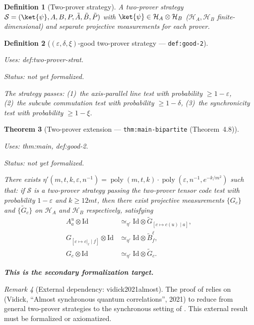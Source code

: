 \documentclass{article}
\providecommand{\uses}[1]{\par\smallskip\noindent\emph{Uses:} #1.\par\smallskip}
\providecommand{\notready}{\par\smallskip\noindent\emph{Status: not yet formalized.}\par\smallskip}
\newtheorem{definition}{Definition}[section]
\newtheorem{theorem}[definition]{Theorem}
\theoremstyle{remark}
\newtheorem{remark}[definition]{Remark}
\newcommand{\id}{\mathrm{Id}}
\newcommand{\hilb}{\mathcal{H}}
\newcommand{\eps}{\varepsilon}
\begin{document}
\begin{definition}[Two-prover strategy]\label{def:two-prover-strat}
	A two-prover strategy
	$\mathcal{S}=(\ket{\psi},A,B,P,\tilde A,\tilde B,\tilde P)$ with
	$\ket{\psi}\in\hilb_A\otimes\hilb_B$
	($\hilb_A,\hilb_B$ finite-dimensional)
	and separate projective measurements for each prover.
\end{definition}

\begin{definition}[$(\eps,\delta,\xi)$-good two-prover strategy --- \texttt{def:good-2}]
	\label{def:good-2}
	\uses{def:two-prover-strat}
	\notready
	The strategy passes:
	(1)~the axis-parallel line test with probability $\ge 1-\eps$,
	(2)~the subcube commutation test with probability $\ge 1-\delta$,
	(3)~the synchronicity test with probability $\ge 1-\xi$.
\end{definition}

\begin{theorem}[Two-prover extension --- \texttt{thm:main-bipartite} (Theorem~4.8)]
	\label{thm:main-bipartite}
	\uses{thm:main, def:good-2}
	\notready
	There exists
	$\eta'(m,t,k,\eps,n^{-1})=\operatorname{poly}(m,t,k)\cdot\operatorname{poly}(\eps,n^{-1},e^{-k/m^2})$
	such that: if $\mathcal{S}$ is a two-prover strategy passing the two-prover
	tensor code test with probability $1-\eps$ and $k\ge 12mt$, then there
	exist projective measurements $\{G_c\}$ and $\{\tilde G_c\}$ on
	$\hilb_A$ and $\hilb_B$ respectively, satisfying
	\begin{align*}
		A^u_a\otimes\id                        & \simeq_{\eta'}\id\otimes\tilde G_{[c\mapsto c(u)\mid a]}, \\
		G_{[c\mapsto c|_\ell\mid f]}\otimes\id & \simeq_{\eta'}\id\otimes\tilde B^\ell_f,                  \\
		G_c\otimes\id                          & \simeq_{\eta'}\id\otimes\tilde G_c.
	\end{align*}

	\textbf{This is the secondary formalization target.}
\end{theorem}

\begin{remark}[External dependency: vidick2021almost]\label{rmk:bipartite-dep}
	The proof of  relies on
	\cite{vidick2021almost} (Vidick, ``Almost synchronous quantum correlations'',
	2021) to reduce from general two-prover strategies to the synchronous
	setting of . This external result must be formalized or
	axiomatized.
\end{remark}
\end{document}
